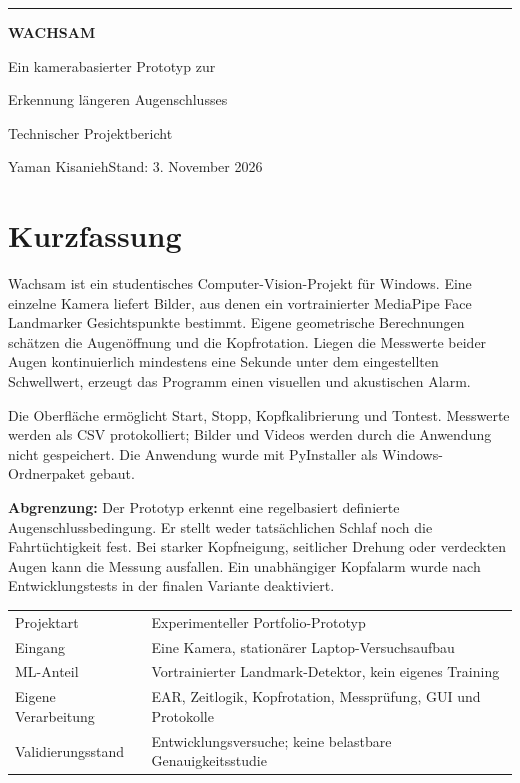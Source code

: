 \documentclass[11pt,a4paper]{article}
\begin{document}
\thispagestyle{empty}
{\color{accent}\rule{\textwidth}{2pt}}
\vspace*{16mm}
{\Huge\bfseries WACHSAM}\par
\vspace{4mm}
{\LARGE Ein kamerabasierter Prototyp zur\par Erkennung längeren Augenschlusses}\par
\vspace{8mm}
{\large Technischer Projektbericht}\par
Yaman Kisanieh\hfill Stand: 3. November 2026
\vspace{14mm}
\section*{Kurzfassung}
Wachsam ist ein studentisches Computer-Vision-Projekt für Windows. Eine einzelne Kamera liefert Bilder, aus denen ein vortrainierter MediaPipe Face Landmarker Gesichtspunkte bestimmt. Eigene geometrische Berechnungen schätzen die Augenöffnung und die Kopfrotation. Liegen die Messwerte beider Augen kontinuierlich mindestens eine Sekunde unter dem eingestellten Schwellwert, erzeugt das Programm einen visuellen und akustischen Alarm.

Die Oberfläche ermöglicht Start, Stopp, Kopfkalibrierung und Tontest. Messwerte werden als CSV protokolliert; Bilder und Videos werden durch die Anwendung nicht gespeichert. Die Anwendung wurde mit PyInstaller als Windows-Ordnerpaket gebaut.

\textbf{Abgrenzung:} Der Prototyp erkennt eine regelbasiert definierte Augenschlussbedingung. Er stellt weder tatsächlichen Schlaf noch die Fahrtüchtigkeit fest. Bei starker Kopfneigung, seitlicher Drehung oder verdeckten Augen kann die Messung ausfallen. Ein unabhängiger Kopfalarm wurde nach Entwicklungstests in der finalen Variante deaktiviert.
\vspace{6mm}
\begin{tabularx}{\textwidth}{@{}p{38mm}Y@{}}\toprule
Projektart & Experimenteller Portfolio-Prototyp\\
Eingang & Eine Kamera, stationärer Laptop-Versuchsaufbau\\
ML-Anteil & Vortrainierter Landmark-Detektor, kein eigenes Training\\
Eigene Verarbeitung & EAR, Zeitlogik, Kopfrotation, Messprüfung, GUI und Protokolle\\
Validierungsstand & Entwicklungsversuche; keine belastbare Genauigkeitsstudie\\\bottomrule
\end{tabularx}
\vfill
\newpage
\end{document}
